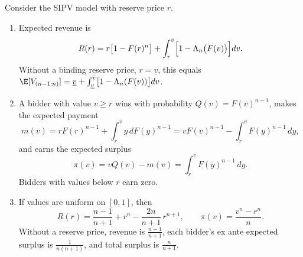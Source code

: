 \begin{proposition}\label{prop:14-spa-revenue}
Consider the SIPV model with reserve price $r$.
\begin{enumerate}[label=(\roman*)]
  \item Expected revenue is
  \begin{equation}\label{eq:14-spa-revenue}
  R(r)=r\bigl[1-F(r)^n\bigr]+\int_r^{\bar v}\Bigl[1-\Lambda_n\bigl(F(v)\bigr)\Bigr]dv.
  \end{equation}
  Without a binding reserve price, $r=\underline v$, this equals
  $\E[V_{(n-1:n)}]=\underline v+\int_{\underline v}^{\bar v}\bigl[1-\Lambda_n(F(v))\bigr]dv$.
  \item A bidder with value $v\ge r$ wins with probability $Q(v)=F(v)^{n-1}$, makes the expected payment
  \begin{equation}\label{eq:14-spa-payment}
  m(v)=rF(r)^{n-1}+\int_r^{v}y\,dF(y)^{n-1}=vF(v)^{n-1}-\int_r^{v}F(y)^{n-1}\,dy,
  \end{equation}
  and earns the expected surplus
  \begin{equation}\label{eq:14-spa-surplus}
  \pi(v)=vQ(v)-m(v)=\int_r^{v}F(y)^{n-1}\,dy.
  \end{equation}
  Bidders with values below $r$ earn zero.
  \item If values are uniform on $[0,1]$, then
  \begin{equation}\label{eq:14-spa-uniform}
  R(r)=\frac{n-1}{n+1}+r^n-\frac{2n}{n+1}\,r^{n+1},\qquad \pi(v)=\frac{v^n-r^n}{n}.
  \end{equation}
  Without a reserve price, revenue is $\frac{n-1}{n+1}$, each bidder's ex ante expected surplus is
  $\frac{1}{n(n+1)}$, and total surplus is $\frac{n}{n+1}$.
\end{enumerate}
\end{proposition}

